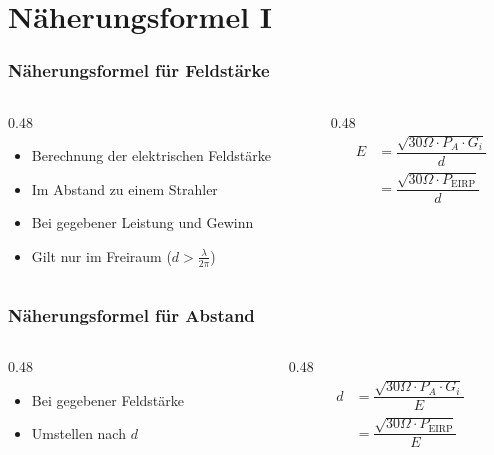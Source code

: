 
\section{Näherungsformel I}
\label{section:naeherungsformel_1}
\begin{frame}%

    \frametitle{Näherungsformel für Feldstärke}
    \begin{columns}
        \begin{column}{0.48\textwidth}
            \begin{itemize}
                \item Berechnung der elektrischen Feldstärke
                \item Im Abstand zu einem Strahler
                \item Bei gegebener Leistung und Gewinn
                \item Gilt nur im Freiraum ($d > \frac{\lambda}{2\pi}$)
            \end{itemize}

        \end{column}
        \begin{column}{0.48\textwidth}
            \begin{equation}\begin{split} E &= \dfrac{\sqrt{30\Omega \cdot P_A \cdot G_i}}{d}\\ &= \dfrac{\sqrt{30\Omega \cdot P_{\textrm{EIRP}}}}{d} \end{split}\end{equation}


        \end{column}
    \end{columns}

\end{frame}

\begin{frame}
    \frametitle{Näherungsformel für Abstand}
    \begin{columns}
        \begin{column}{0.48\textwidth}
            \begin{itemize}
                \item Bei gegebener Feldstärke
                \item Umstellen nach $d$
            \end{itemize}

        \end{column}
        \begin{column}{0.48\textwidth}
            \begin{equation*}
                \begin{split}
                    d &= \dfrac{\sqrt{30\Omega \cdot P_A \cdot G_i}}{E}\\
                      &= \dfrac{\sqrt{30\Omega \cdot P_{\text{EIRP}}}}{E}
                \end{split}\end{equation*}
        \end{column}
    \end{columns}

\end{frame}

